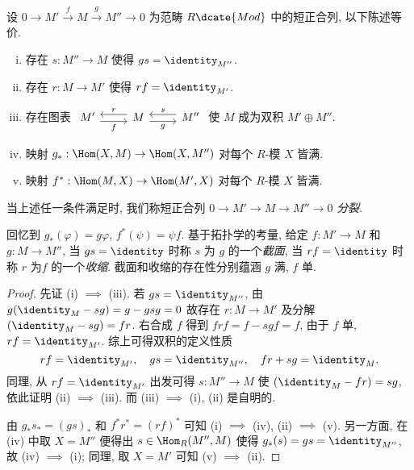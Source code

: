 \begin{proposition}\label{prop:split-ses-mod}
	设 $0 \to M' \xrightarrow{f} M \xrightarrow{g} M'' \to 0$ 为范畴 $R\dcate{Mod}$ 中的短正合列, 以下陈述等价.
	\begin{enumerate}[(i)]
		\item 存在 $s: M'' \to M$ 使得 $gs = \identity_{M''}$.
		\item 存在 $r: M \to M'$ 使得 $rf = \identity_{M'}$.
		\item 存在图表 $\begin{tikzcd} M' \arrow[yshift=-0.7ex, r, "f"'] & M \arrow[yshift=0.7ex, l, "r"'] \arrow[yshift=-0.7ex, r, "g"'] & M'' \arrow[yshift=0.7ex, l, "s"'] \end{tikzcd}$ 使 $M$ 成为双积 $M' \oplus M''$.
		\item 映射 $g_*: \Hom(X, M) \to \Hom(X, M'')$ 对每个 $R$-模 $X$ 皆满.
		\item 映射 $f^*: \Hom(M, X) \to \Hom(M', X)$ 对每个 $R$-模 $X$ 皆满.
	\end{enumerate}
	当上述任一条件满足时, 我们称短正合列 $0 \to M' \to M \to M'' \to 0$ \emph{分裂}.
\end{proposition}
回忆到 $g_*(\varphi) = g\varphi$, $f^*(\psi) = \psi f$. 基于拓扑学的考量, 给定 $f: M' \to M$ 和 $g: M \to M''$, 当 $gs = \identity$ 时称 $s$ 为 $g$ 的一个\emph{截面}, 当 $rf = \identity$ 时称 $r$ 为$f$ 的一个\emph{收缩}. 截面和收缩的存在性分别蕴涵 $g$ 满, $f$ 单.
\begin{proof}
	先证 (i) $\implies$ (iii). 若 $gs = \identity_{M''}$, 由 $g( \identity_M - sg) = g - gsg = 0$ 故存在 $r: M \to M'$ 及分解 $(\identity_M - sg) = fr $. 右合成 $f$ 得到 $frf = f-sgf = f$, 由于 $f$ 单, $rf=\identity_{M'}$. 综上可得双积的定义性质
	\[ rf = \identity_{M'}, \quad gs = \identity_{M''}, \quad fr + sg  = \identity_M. \]
	同理, 从 $rf = \identity_{M'}$ 出发可得 $s: M'' \to M$ 使 $(\identity_M - fr) = sg$, 依此证明 (ii) $\implies$ (iii). 而 (iii) $\implies$ (i), (ii) 是自明的.
	
	由 $g_* s_* = (gs)_*$ 和 $f^* r^* = (rf)^*$ 可知 (i) $\implies$ (iv), (ii) $\implies$ (v). 另一方面, 在 (iv) 中取 $X = M''$ 便得出 $s \in \Hom_R(M'', M)$ 使得 $g_*(s) = gs = \identity_{M''}$, 故 (iv) $\implies$ (i); 同理, 取 $X = M'$ 可知 (v) $\implies$ (ii).
\end{proof}

